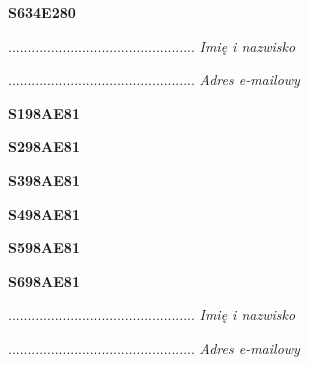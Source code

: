 \begin{turn}{90}\huge \textbf{S634E280}\end{turn}

\begin{turn}{90}\begin{minipage}{\linewidth} \vspace{20mm} ................................................  \textit{Imię i nazwisko}\end{minipage}\end{turn}

\begin{turn}{90}\begin{minipage}{\linewidth} \vspace{20mm} ................................................  \textit{Adres e-mailowy}\end{minipage}\end{turn}

\begin{turn}{90}\huge \textbf{S198AE81}\end{turn}

\begin{turn}{90}\huge \textbf{S298AE81}\end{turn}

\begin{turn}{90}\huge \textbf{S398AE81}\end{turn}

\begin{turn}{90}\huge \textbf{S498AE81}\end{turn}

\begin{turn}{90}\huge \textbf{S598AE81}\end{turn}

\begin{turn}{90}\huge \textbf{S698AE81}\end{turn}

\begin{turn}{90}\begin{minipage}{\linewidth} \vspace{20mm} ................................................  \textit{Imię i nazwisko}\end{minipage}\end{turn}

\begin{turn}{90}\begin{minipage}{\linewidth} \vspace{20mm} ................................................  \textit{Adres e-mailowy}\end{minipage}\end{turn}

